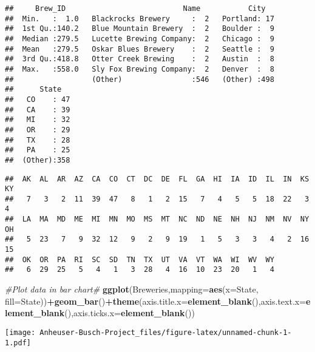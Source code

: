 \documentclass[]{article}
\newenvironment{Shaded}{\begin{snugshade}}{\end{snugshade}}
\newcommand{\CommentTok}[1]{\textcolor[rgb]{0.56,0.35,0.01}{\textit{#1}}}
\newcommand{\DataTypeTok}[1]{\textcolor[rgb]{0.13,0.29,0.53}{#1}}
\newcommand{\KeywordTok}[1]{\textcolor[rgb]{0.13,0.29,0.53}{\textbf{#1}}}
\newcommand{\NormalTok}[1]{#1}
\newcommand{\OperatorTok}[1]{\textcolor[rgb]{0.81,0.36,0.00}{\textbf{#1}}}
\begin{document}
\begin{verbatim}
##     Brew_ID                           Name           City    
##  Min.   :  1.0   Blackrocks Brewery     :  2   Portland: 17  
##  1st Qu.:140.2   Blue Mountain Brewery  :  2   Boulder :  9  
##  Median :279.5   Lucette Brewing Company:  2   Chicago :  9  
##  Mean   :279.5   Oskar Blues Brewery    :  2   Seattle :  9  
##  3rd Qu.:418.8   Otter Creek Brewing    :  2   Austin  :  8  
##  Max.   :558.0   Sly Fox Brewing Company:  2   Denver  :  8  
##                  (Other)                :546   (Other) :498  
##      State    
##   CO    : 47  
##   CA    : 39  
##   MI    : 32  
##   OR    : 29  
##   TX    : 28  
##   PA    : 25  
##  (Other):358
\end{verbatim}

\begin{Shaded}
\end{Shaded}

\begin{verbatim}
##  AK  AL  AR  AZ  CA  CO  CT  DC  DE  FL  GA  HI  IA  ID  IL  IN  KS  KY 
##   7   3   2  11  39  47   8   1   2  15   7   4   5   5  18  22   3   4 
##  LA  MA  MD  ME  MI  MN  MO  MS  MT  NC  ND  NE  NH  NJ  NM  NV  NY  OH 
##   5  23   7   9  32  12   9   2   9  19   1   5   3   3   4   2  16  15 
##  OK  OR  PA  RI  SC  SD  TN  TX  UT  VA  VT  WA  WI  WV  WY 
##   6  29  25   5   4   1   3  28   4  16  10  23  20   1   4
\end{verbatim}

\begin{Shaded}
\begin{Highlighting}[]
\CommentTok{#Plot data in bar chart#}
\KeywordTok{ggplot}\NormalTok{(Breweries,}\DataTypeTok{mapping=}\KeywordTok{aes}\NormalTok{(}\DataTypeTok{x=}\NormalTok{State, }\DataTypeTok{fill=}\NormalTok{State))}\OperatorTok{+}\KeywordTok{geom_bar}\NormalTok{()}\OperatorTok{+}\KeywordTok{theme}\NormalTok{(}\DataTypeTok{axis.title.x=}\KeywordTok{element_blank}\NormalTok{(),}\DataTypeTok{axis.text.x=}\KeywordTok{element_blank}\NormalTok{(),}\DataTypeTok{axis.ticks.x=}\KeywordTok{element_blank}\NormalTok{())}
\end{Highlighting}
\end{Shaded}

\texttt{[image: Anheuser-Busch-Project\_files/figure-latex/unnamed-chunk-1-1.pdf]}
\end{document}
